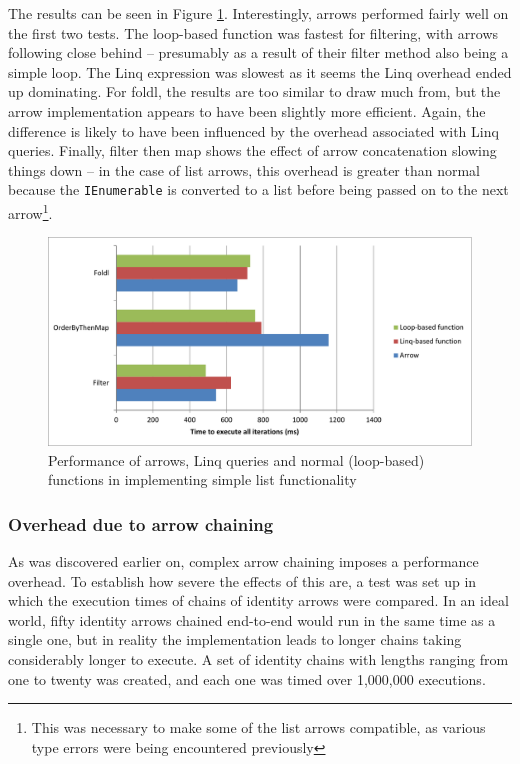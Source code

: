 \documentclass[12pt,twoside,notitlepage]{report}
\begin{document}
The results can be seen in Figure \ref{fig:list_function_performance}. Interestingly, arrows performed fairly well on the first two tests. The loop-based function was fastest for filtering, with arrows following close behind -- presumably as a result of their filter method also being a simple loop. The Linq expression was slowest as it seems the Linq overhead ended up dominating. For foldl, the results are too similar to draw much from, but the arrow implementation appears to have been slightly more efficient. Again, the difference is likely to have been influenced by the overhead associated with Linq queries. Finally, filter then map shows the effect of arrow concatenation slowing things down -- in the case of list arrows, this overhead is greater than normal because the \texttt{IEnumerable} is converted to a list before being passed on to the next arrow\footnote{This was necessary to make some of the list arrows compatible, as various type errors were being encountered previously}.

\begin{figure}[!ht]
  \centering
  \includegraphics[width=\textwidth]{fig/ListFunctionPerformanceChart.pdf}
  \caption{Performance of arrows, Linq queries and normal (loop-based) functions in implementing simple list functionality}
  \label{fig:list_function_performance}
\end{figure}

\subsubsection{Overhead due to arrow chaining}
\label{sec:arrow_chaining_overhead}

As was discovered earlier on, complex arrow chaining imposes a performance overhead. To establish how severe the effects of this are, a test was set up in which the execution times of chains of identity arrows were compared. In an ideal world, fifty identity arrows chained end-to-end would run in the same time as a single one, but in reality the implementation leads to longer chains taking considerably longer to execute. A set of identity chains with lengths ranging from one to twenty was created, and each one was timed over 1,000,000 executions.
\end{document}
